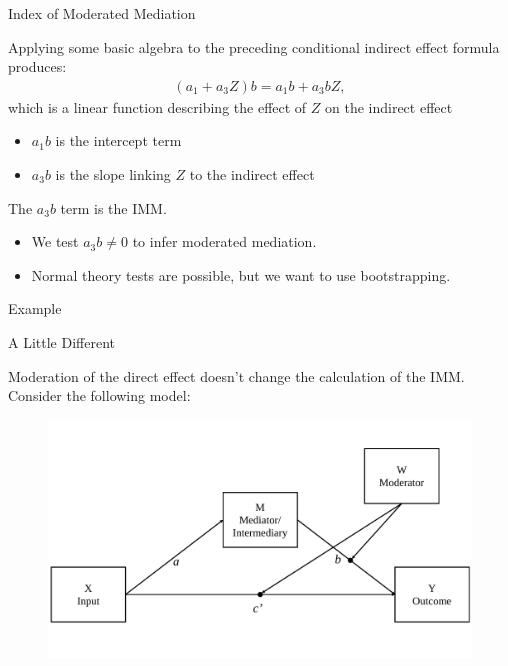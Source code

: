 \documentclass{beamer}
\newcommand{\va}[0]{\vspace{12pt}}
\newcommand{\vb}[0]{\vspace{6pt}}
\begin{document}
\begin{frame}{Index of Moderated Mediation}
  
  Applying some basic algebra to the preceding conditional indirect
  effect formula produces:
  \begin{align*}
    \left(a_1 + a_3Z \right) b = a_1b + a_3bZ,
  \end{align*}
  which is a linear function describing the effect of $Z$ on the
  indirect effect
  \begin{itemize}
    \item $a_1b$ is the intercept term
    \item $a_3b$ is the slope linking $Z$ to the indirect effect
  \end{itemize}
  \vb
  The $a_3b$ term is the IMM.
  \vb
  \begin{itemize}
    \item We test $a_3b \neq 0$ to infer moderated mediation.
    \item Normal theory tests are possible, but we want to use
      bootstrapping.
  \end{itemize}
  
\end{frame}



\begin{frame}[allowframebreaks]{Example}
  


\pagebreak



\end{frame}



\begin{frame}{A Little Different}
  
  Moderation of the direct effect doesn't change the calculation of
  the IMM.\\
  \va
  Consider the following model:
  \begin{figure}
    \includegraphics[width = \textwidth]{figures/modBCwithWConceptual.pdf}
  \end{figure}
  
\end{frame}
\end{document}
